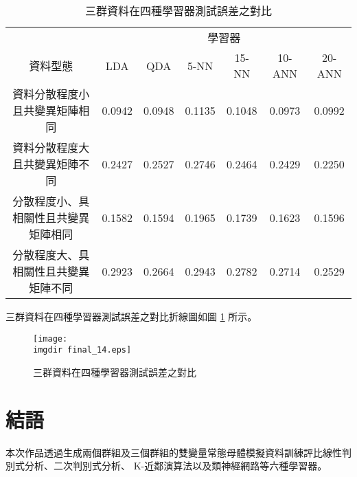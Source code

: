 \begin{table}[H] 
\centering
\caption{三群資料在四種學習器測試誤差之對比}\label{tb:final_4}
\tabcolsep=2pt
\begin{tabular}{ccccccc} 
\toprule
& \multicolumn{6}{c}{學習器}\\
\cmidrule(l){2-7}
資料型態 & LDA & QDA & 5-NN & 15-NN & 10-ANN & 20-ANN\\[3pt]
\midrule
資料分散程度小且共變異矩陣相同 & \cellcolor{red!25}0.0942 & 0.0948  & 0.1135 & 0.1048 & 0.0973 & 0.0992\\[3pt]
資料分散程度大且共變異矩陣不同 & 0.2427 & 0.2527 & 0.2746 & 0.2464 & 0.2429 & \cellcolor{red!25}0.2250\\ [3pt]
分散程度小、具相關性且共變異矩陣相同 & \cellcolor{red!25}0.1582 & 0.1594 & 0.1965 & 0.1739 & 0.1623 & 0.1596\\ [3pt]
分散程度大、具相關性且共變異矩陣不同 & 0.2923 & 0.2664 & 0.2943 & 0.2782 & 0.2714 & \cellcolor{red!25}0.2529\\
\bottomrule
\end{tabular}
\end{table} 
\newpage
三群資料在四種學習器測試誤差之對比折線圖如圖 \ref{fig:final_14} 所示。
\begin{figure}[H]
    \centering
        \texttt{[image: \\imgdir final\_14.eps]}
    \caption{三群資料在四種學習器測試誤差之對比}
    \label{fig:final_14}
\end{figure}
\section{結語}
本次作品透過生成兩個群組及三個群組的雙變量常態母體模擬資料訓練評比線性判別式分析、二次判別式分析、 K-近鄰演算法以及類神經網路等六種學習器。
%